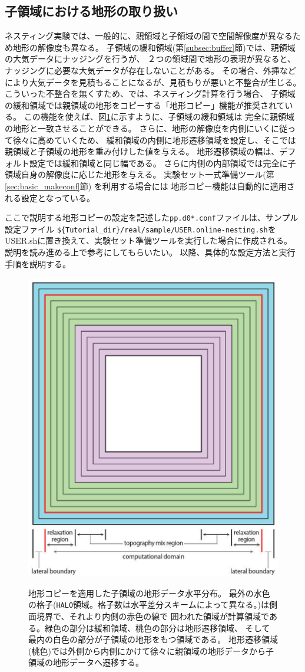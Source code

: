 \subsection{子領域における地形の取り扱い} \label{subsec:nest_topo}
ネスティング実験では、一般的に、親領域と子領域の間で空間解像度が異なるため地形の解像度も異なる。
子領域の緩和領域(第\ref{subsec:buffer}節)では、親領域の大気データにナッジングを行うが、
２つの領域間で地形の表現が異なると、ナッジングに必要な大気データが存在しないことがある。
その場合、外挿などにより大気データを見積もることになるが、見積もりが悪いと不整合が生じる。
%
こういった不整合を無くすため、\scalerm では、ネスティング計算を行う場合、
子領域の緩和領域では親領域の地形をコピーする「地形コピー」機能が推奨されている。
この機能を使えば、図\ref{fig_topocopy}に示すように、子領域の緩和領域は
完全に親領域の地形と一致させることができる。
さらに、地形の解像度を内側にいくに従って徐々に高めていくため、
緩和領域の内側に地形遷移領域を設定し、そこでは親領域と子領域の地形を重み付けした値を与える。
地形遷移領域の幅は、デフォルト設定では緩和領域と同じ幅である。
さらに内側の内部領域では完全に子領域自身の解像度に応じた地形を与える。
実験セット一式準備ツール(第\ref{sec:basic_makeconf}節) を利用する場合には
地形コピー機能は自動的に適用される設定となっている。


ここで説明する地形コピーの設定を記述した\verb|pp.d0*.conf|ファイルは、サンプル設定ファイル
\verb|${Tutorial_dir}/real/sample/USER.online-nesting.sh|を
USER.shに置き換えて、実験セット準備ツールを実行した場合に作成される。
説明を読み進める上で参考にしてもらいたい。
%
以降、具体的な設定方法と実行手順を説明する。


\begin{figure}[htb]
\begin{center}
  \includegraphics[width=0.4\hsize]{./figure/topo_copy.eps}\\
  \caption{地形コピーを適用した子領域の地形データ水平分布。
最外の水色の格子(\texttt{HALO}領域。格子数は水平差分スキームによって異なる。)は側面境界で、それより内側の赤色の線で
囲われた領域が計算領域である。緑色の部分は緩和領域、桃色の部分は地形遷移領域、
そして最内の白色の部分が子領域の地形をもつ領域である。
地形遷移領域(桃色)では外側から内側にかけて徐々に親領域の地形データから子領域の地形データへ遷移する。}
  \label{fig_topocopy}
\end{center}
\end{figure}


